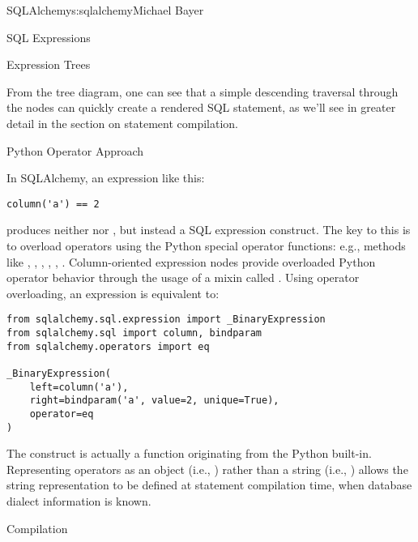 \begin{aosachapter}{SQLAlchemy}{s:sqlalchemy}{Michael Bayer}
\begin{aosasect1}{SQL Expressions}
\begin{aosasect2}{Expression Trees}

From the tree diagram, one can see that a simple descending traversal through
the nodes can quickly create a rendered SQL statement, as we'll see in greater
detail in the section on statement compilation.

\end{aosasect2}

\newpage

\begin{aosasect2}{Python Operator Approach}


In SQLAlchemy, an expression like this:

\begin{verbatim}
column('a') == 2
\end{verbatim}

\noindent produces neither  nor , but instead a SQL expression
construct. The key to this is to overload operators using the Python special
operator functions: e.g., methods like , ,
, , , . Column-oriented
expression nodes provide overloaded Python operator behavior through the usage
of a mixin called . Using operator overloading, an
expression  is equivalent to:

\begin{verbatim}
from sqlalchemy.sql.expression import _BinaryExpression
from sqlalchemy.sql import column, bindparam
from sqlalchemy.operators import eq

_BinaryExpression(
    left=column('a'),
    right=bindparam('a', value=2, unique=True),
    operator=eq
)
\end{verbatim}

\noindent The  construct is actually a function originating from the Python
 built-in.  Representing operators as an object (i.e.,
) rather than a string (i.e., \code{=}) allows the string
representation to be defined at statement compilation time, when database
dialect information is known.

\end{aosasect2}

\begin{aosasect2}{Compilation}


\end{aosasect2}
\end{aosasect1}
\end{aosachapter}
